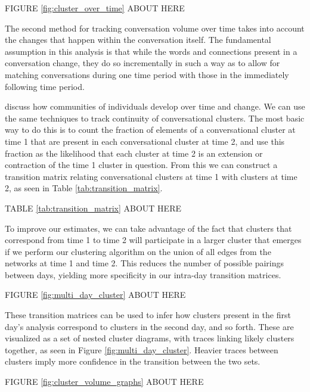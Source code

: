 \documentclass[12pt]{article}
\begin{document}
\begin{center}
FIGURE \ref{fig:cluster_over_time} ABOUT HERE
\end{center}

The second method for tracking conversation volume over time takes into account the changes that happen within the conversation itself. The fundamental assumption in this analysis is that while the words and connections present in a conversation change, they do so incrementally in such a way as to allow for matching conversations during one time period with those in the immediately following time period. 

\cite{Palla2007} discuss how communities of individuals develop over time and change. We can use the same techniques to track continuity of conversational clusters. The most basic way to do this is to count the fraction of elements of a conversational cluster at time 1 that are present in each conversational cluster at time 2, and use this fraction as the likelihood that each cluster at time 2 is an extension or contraction of the time 1 cluster in question. From this we can construct a transition matrix relating conversational clusters at time 1 with clusters at time 2, as seen in Table \ref{tab:transition_matrix}.

\begin{center}
TABLE \ref{tab:transition_matrix} ABOUT HERE
\end{center}

To improve our estimates, we can take advantage of the fact that clusters that correspond from time 1 to time 2 will participate in a larger cluster that emerges if we perform our clustering algorithm on the union of all edges from the networks at time 1 and time 2. This reduces the number of possible pairings between days, yielding more specificity in our intra-day transition matrices.

\begin{center}
FIGURE \ref{fig:multi_day_cluster} ABOUT HERE
\end{center}

These transition matrices can be used to infer how clusters present in the first day's analysis correspond to clusters in the second day, and so forth. These are visualized as a set of nested cluster diagrams, with traces linking likely clusters together, as seen in Figure \ref{fig:multi_day_cluster}. Heavier traces between clusters imply more confidence in the transition between the two sets.

\begin{center}
FIGURE \ref{fig:cluster_volume_graphs} ABOUT HERE
\end{center}
\end{document}
